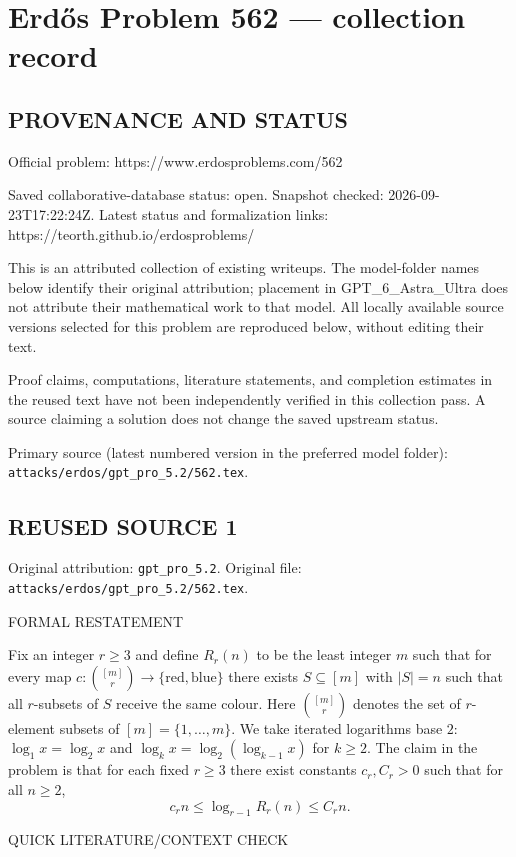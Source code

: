 \section*{Erd\H{o}s Problem 562 --- collection record}

\subsection*{PROVENANCE AND STATUS}
Official problem: https://www.erdosproblems.com/562

Saved collaborative-database status: open.
Snapshot checked: 2026-09-23T17:22:24Z.
Latest status and formalization links: https://teorth.github.io/erdosproblems/

This is an attributed collection of existing writeups. The model-folder names below identify their original attribution; placement in GPT\_6\_Astra\_Ultra does not attribute their mathematical work to that model. All locally available source versions selected for this problem are reproduced below, without editing their text.

Proof claims, computations, literature statements, and completion estimates in the reused text have not been independently verified in this collection pass. A source claiming a solution does not change the saved upstream status.

Primary source (latest numbered version in the preferred model folder): \texttt{attacks/erdos/gpt\_pro\_5.2/562.tex}.

\subsection*{REUSED SOURCE 1}
Original attribution: \texttt{gpt\_pro\_5.2}.
Original file: \texttt{attacks/erdos/gpt\_pro\_5.2/562.tex}.


FORMAL RESTATEMENT

Fix an integer $r\ge 3$ and define $R_r(n)$ to be the least integer $m$ such that for every map
$c:\binom{[m]}{r}\to\{\text{red},\text{blue}\}$ there exists $S\subseteq[m]$ with $|S|=n$ such that all $r$-subsets of $S$ receive the same colour.
Here $\binom{[m]}{r}$ denotes the set of $r$-element subsets of $[m]=\{1,\dots,m\}$. We take iterated logarithms base $2$:
$\log_1 x = \log_2 x$ and $\log_k x = \log_2(\log_{k-1} x)$ for $k\ge 2$.
The claim in the problem is that for each fixed $r\ge 3$ there exist constants $c_r,C_r>0$ such that for all $n\ge 2$,
\[
 c_r n \le \log_{r-1} R_r(n) \le C_r n.
\]

QUICK LITERATURE/CONTEXT CHECK

